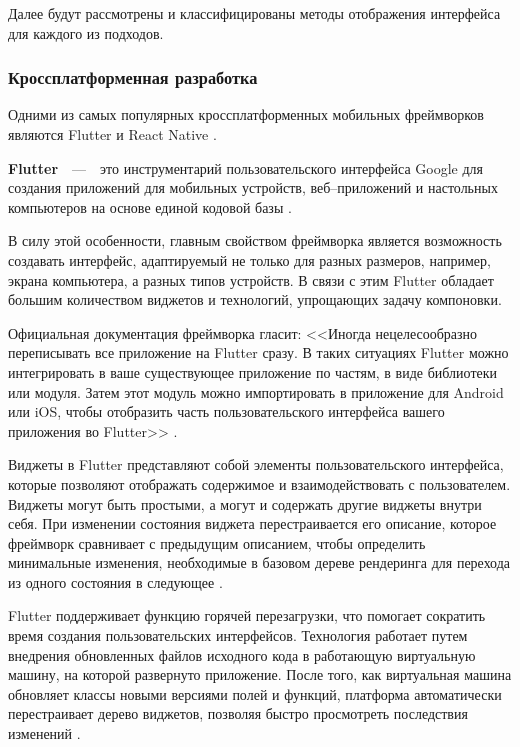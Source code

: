 Далее будут рассмотрены и классифицированы методы отображения интерфейса для каждого из подходов.

\subsubsection{Кроссплатформенная разработка} 

Одними из самых популярных кроссплатформенных мобильных фреймворков являются Flutter и React Native \cite{crossplatform-stat}.



\textbf{Flutter}~~---~~это инструментарий пользовательского интерфейса Google для создания приложений для мобильных устройств, веб--приложений и настольных компьютеров на основе единой кодовой базы \cite{flutter}. 

В силу этой особенности, главным свойством фреймворка является возможность создавать интерфейс, адаптируемый не только для разных размеров, например, экрана компьютера, а разных типов устройств. 
В связи с этим Flutter обладает большим количеством виджетов и технологий, упрощающих задачу компоновки. 

Официальная документация фреймворка гласит: <<Иногда нецелесообразно переписывать все приложение на Flutter сразу. 
В таких ситуациях Flutter можно интегрировать в ваше существующее приложение по частям, в виде библиотеки или модуля. 
Затем этот модуль можно импортировать в приложение для Android или iOS, чтобы отобразить часть пользовательского интерфейса вашего приложения во Flutter>> \cite{flutter-integr}.

Виджеты в Flutter представляют собой элементы пользовательского интерфейса, которые позволяют отображать содержимое и взаимодействовать с пользователем. 
Виджеты могут быть простыми, а могут и содержать другие виджеты внутри себя. 
При изменении состояния виджета перестраивается его описание, которое фреймворк сравнивает с предыдущим описанием, чтобы определить минимальные изменения, необходимые в базовом дереве рендеринга для перехода из одного состояния в следующее \cite{flutter-ui}.

Flutter поддерживает функцию горячей перезагрузки, что помогает сократить время создания пользовательских интерфейсов.
Технология работает путем внедрения обновленных файлов исходного кода в работающую виртуальную машину, на которой развернуто приложение. 
После того, как виртуальная машина обновляет классы новыми версиями полей и функций, платформа автоматически перестраивает дерево виджетов, позволяя быстро просмотреть последствия изменений \cite{flutter-hot-reload}.

